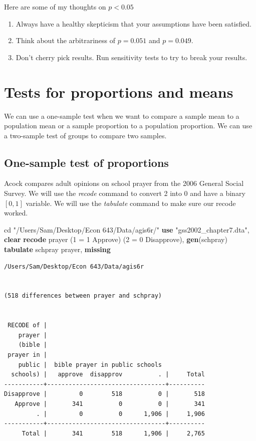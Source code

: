 \documentclass[
]{book}
\newenvironment{Shaded}{\begin{snugshade}}{\end{snugshade}}
\newcommand{\FunctionTok}[1]{\textcolor[rgb]{0.13,0.29,0.53}{\textbf{#1}}}
\newcommand{\KeywordTok}[1]{\textcolor[rgb]{0.13,0.29,0.53}{\textbf{#1}}}
\newcommand{\NormalTok}[1]{#1}
\newcommand{\StringTok}[1]{\textcolor[rgb]{0.31,0.60,0.02}{#1}}
\providecommand{\tightlist}{%
  \setlength{\itemsep}{0pt}\setlength{\parskip}{0pt}}
\begin{document}
Here are some of my thoughts on \(p < 0.05\)

\begin{enumerate}
\def\labelenumi{\arabic{enumi}.}
\tightlist
\item
  Always have a healthy skepticism that your assumptions have been satisfied.
\item
  Think about the arbitrariness of \(p=0.051\) and \(p=0.049\).
\item
  Don't cherry pick results. Run sensitivity tests to try to break your results.
\end{enumerate}

\chapter{Tests for proportions and means}\label{tests-for-proportions-and-means}

We can use a one-sample test when we want to compare a sample mean to a population mean or a sample proportion to a population proportion. We can use a two-sample test of groups to compare two samples.

\section{One-sample test of proportions}\label{one-sample-test-of-proportions}

Acock compares adult opinions on school prayer from the 2006 General Social Survey. We will use the \emph{recode} command to convert 2 into 0 and have a binary \([0,1]\) variable. We will use the \emph{tabulate} command to make sure our recode worked.

\begin{Shaded}
\begin{Highlighting}[]
\NormalTok{cd }\StringTok{"/Users/Sam/Desktop/Econ 643/Data/agis6r/"}
\KeywordTok{use} \StringTok{"gss2002\_chapter7.dta"}\NormalTok{, }\KeywordTok{clear}
\KeywordTok{recode}\NormalTok{ prayer (1 = 1 Approve) (2 = 0 Disapprove), }\KeywordTok{gen}\NormalTok{(schpray)}
\KeywordTok{tabulate}\NormalTok{ schpray prayer, }\FunctionTok{missing}
\end{Highlighting}
\end{Shaded}

\begin{verbatim}
/Users/Sam/Desktop/Econ 643/Data/agis6r


(518 differences between prayer and schpray)


 RECODE of |
    prayer |
    (bible |
 prayer in |
    public |  bible prayer in public schools
  schools) |   approve  disapprov          . |     Total
-----------+---------------------------------+----------
Disapprove |         0        518          0 |       518 
   Approve |       341          0          0 |       341 
         . |         0          0      1,906 |     1,906 
-----------+---------------------------------+----------
     Total |       341        518      1,906 |     2,765 
\end{verbatim}
\end{document}

